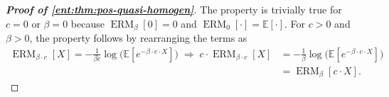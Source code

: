 \documentclass[twoside]{article}
\newcommand{\E}{\mathbb{E}}
\newcommand{\erm}[2]{\operatorname{ERM}_{#1}\left[#2\right]}
\newcommand{\ermo}{\operatorname{ERM}}
\theoremstyle{plain}
\theoremstyle{definition}
\theoremstyle{remark}
\begin{document}

\begin{proof}[{\bf\em Proof of \cref{ent:thm:pos-quasi-homogen}}]
The property is trivially true for $c = 0$ or $\beta = 0$ because $\erm{\beta}{0} = 0$ and $\ermo_0[\cdot] = \E[\cdot]$. For $c > 0$ and $\beta >0$, the property follows by rearranging the terms as
%
\begin{align*}
  \erm{\beta \cdot c}{X} = -\frac{1}{\beta c}\log\big(\E[e^{-\beta \cdot c \cdot X}]\big) \; \Longrightarrow \; c \cdot \erm{\beta \cdot c}{X} &= -\frac{1}{\beta}\log\big(\E[e^{-\beta \cdot c \cdot X}]\big) \\
&= \erm{\beta}{c\cdot X}.
\end{align*}
%
\end{proof}

\end{document}
